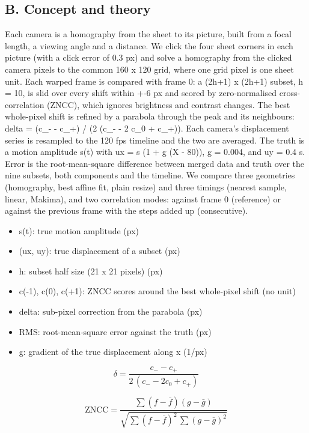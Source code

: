 \documentclass[11pt,a4paper]{article}
\begin{document}
\subsection*{B. Concept and theory}
Each camera is a homography from the sheet to its picture, built from a focal length, a viewing angle and a distance. We click the four sheet corners in each picture (with a click error of 0.3 px) and solve a homography from the clicked camera pixels to the common 160 x 120 grid, where one grid pixel is one sheet unit. Each warped frame is compared with frame 0: a (2h+1) x (2h+1) subset, h = 10, is slid over every shift within +-6 px and scored by zero-normalised cross-correlation (ZNCC), which ignores brightness and contrast changes. The best whole-pixel shift is refined by a parabola through the peak and its neighbours: delta = (c\_- - c\_+) / (2 (c\_- - 2 c\_0 + c\_+)). Each camera's displacement series is resampled to the 120 fps timeline and the two are averaged. The truth is a motion amplitude s(t) with ux = s (1 + g (X - 80)), g = 0.004, and uy = 0.4 s. Error is the root-mean-square difference between merged data and truth over the nine subsets, both components and the timeline. We compare three geometries (homography, best affine fit, plain resize) and three timings (nearest sample, linear, Makima), and two correlation modes: against frame 0 (reference) or against the previous frame with the steps added up (consecutive).

\begin{itemize}[nosep]
\item s(t): true motion amplitude (px)
\item (ux, uy): true displacement of a subset (px)
\item h: subset half size (21 x 21 pixels) (px)
\item c(-1), c(0), c(+1): ZNCC scores around the best whole-pixel shift (no unit)
\item delta: sub-pixel correction from the parabola (px)
\item RMS: root-mean-square error against the truth (px)
\item g: gradient of the true displacement along x (1/px)
\end{itemize}

\begin{equation*}
\delta=\frac{c_{-}-c_{+}}{2\,(c_{-}-2c_{0}+c_{+})}
\end{equation*}

\begin{equation*}
\mathrm{ZNCC}=\frac{\sum (f-\bar f)(g-\bar g)}{\sqrt{\sum (f-\bar f)^2\,\sum (g-\bar g)^2}}
\end{equation*}
\end{document}
